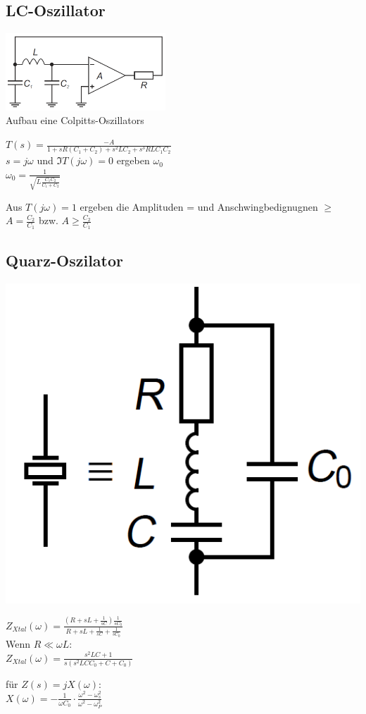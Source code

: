 \subsection{LC-Oszillator}
	\begin{multicols}{3}
		\includegraphics[width=6cm]{bilder/osziLC.png}\\
		Aufbau eine Colpitts-Oszillators
		\columnbreak
		
		$T\left(s\right)=\frac{-A}{1+sR\left(C_1+C_2\right)+s^2LC_2+s^3RLC_1C_2}$\\
		$s=j\omega$ und $\Im{T\left(j\omega\right)}=0$ ergeben $\omega_0$\\
		$\omega_0=\frac{1}{\sqrt{L\frac{C_1 C_2}{C_1+C_2}}}$\\
		\columnbreak
		
		Aus $T\left(j\omega\right)=1$ ergeben die Amplituden = und Anschwingbedignugnen
		$\geq$
		$A=\frac{C_2}{C_1}$ bzw. $A\geq\frac{C_2}{C_1}$
	\end{multicols}
\subsection{Quarz-Oszilator}
	\begin{multicols}{3}
		\includegraphics[width=cm]{bilder/osziCrystal.png}
		\columnbreak
		
		$Z_{Xtal}\left(\omega\right)=\frac{\left(R+sL+\frac{1}{sC}\right)\frac{1}{sC_0}}{R+sL+\frac{1}{sC}+\frac{1}{sC_0}}$\\
		Wenn $R \ll \omega L$:\\
		$Z_{Xtal}\left(\omega\right)=\frac{s^2LC+1}{s\left(s^2LCC_0+C+C_0\right)}$\\
		\columnbreak
		
		f\"ur $Z\left(s\right)=jX\left(\omega\right)$:\\
		$X\left(\omega\right)=-\frac{1}{\omega C_0}\cdot \frac{\omega^2 -
		\omega_s^2}{\omega^2-\omega^2_P}$
	\end{multicols}